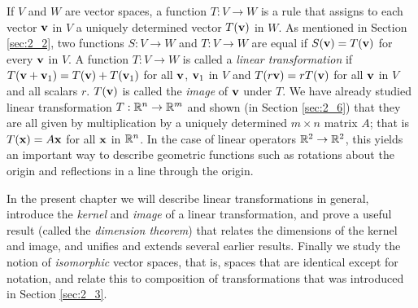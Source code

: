 \noindent If $V$ and $W$ are vector spaces, a function $T : V \to W$ is a rule that assigns to each vector $\textbf{v}$ in $V$ a uniquely determined vector $T(\textbf{v})$ in $W$. As mentioned in Section \ref{sec:2_2}, two functions $S : V \to W$ and $T : V \to W$ are equal if $S(\textbf{v}) = T(\textbf{v})$ for every $\textbf{v}$ in $V$. A function $T : V \to W$ is called a \textit{linear transformation} if $T(\textbf{v} + \textbf{v}_1) = T(\textbf{v}) + T(\textbf{v}_1)$ for all $\textbf{v}$, $\textbf{v}_1$ in $V$ and $T(r\textbf{v}) = rT(\textbf{v})$ for all $\textbf{v}$ in $V$ and all scalars $r$. $T(\textbf{v})$ is called the \textit{image} of $\textbf{v}$ under $T$. We have already studied linear transformation $T : \mathbb{R}^n \to \mathbb{R}^m$ and shown (in Section \ref{sec:2_6}) that they are all given by multiplication by a uniquely determined $m \times n$ matrix $A$; that is $T(\textbf{x}) = A\textbf{x}$ for all $\textbf{x}$ in $\mathbb{R}^n$. In the case of linear operators $\mathbb{R}^2 \to \mathbb{R}^2$, this yields an important way to describe geometric functions such as rotations about the origin and reflections in a line through the origin.

In the present chapter we will describe linear transformations in general, introduce the \textit{kernel} and \textit{image} of a linear transformation, and prove a useful result (called the \textit{dimension theorem}) that relates the dimensions of the kernel and image, and unifies and extends several earlier results. Finally we study the notion of \textit{isomorphic} vector spaces, that is, spaces that are identical except for notation, and relate this to composition of transformations that was introduced in Section \ref{sec:2_3}.

